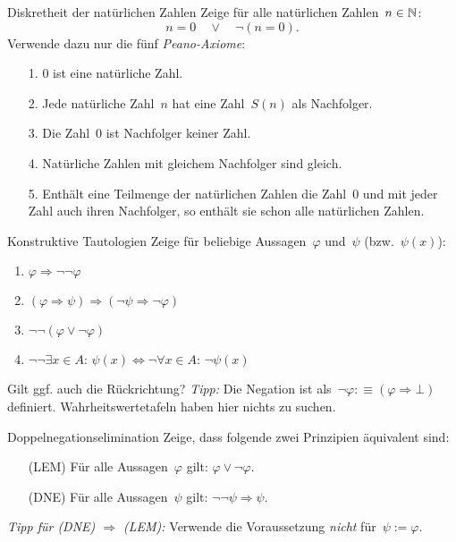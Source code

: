 \documentclass{pizzablatt}
\begin{document}

\begin{aufgabe}{Diskretheit der natürlichen Zahlen}
Zeige für alle natürlichen Zahlen~$n \in \mathbb{N}$:
\[ n = 0 \quad\vee\quad \neg(n = 0). \]
Verwende dazu nur die fünf \emph{Peano-Axiome}:
\begin{enumerate}
\item[1.] $0$ ist eine natürliche Zahl.
\item[2.] Jede natürliche Zahl~$n$ hat eine Zahl~$S(n)$ als Nachfolger.
\item[3.] Die Zahl~$0$ ist Nachfolger keiner Zahl.
\item[4.] Natürliche Zahlen mit gleichem Nachfolger sind gleich.
\item[5.] Enthält eine Teilmenge der natürlichen Zahlen die Zahl~$0$ und mit jeder
Zahl auch ihren Nachfolger, so enthält sie schon alle natürlichen Zahlen.
\end{enumerate}
\end{aufgabe}

\begin{aufgabe}{Konstruktive Tautologien}
Zeige für beliebige Aussagen~$\varphi$ und~$\psi$ (bzw.~$\psi(x)$):
\begin{enumerate}
\item $\varphi \Longrightarrow \neg\neg\varphi$
\item $(\varphi \Rightarrow \psi) \Longrightarrow (\neg\psi \Rightarrow
\neg\varphi)$
\item $\neg\neg(\varphi \vee \neg\varphi)$
\item $\neg\neg\exists x \in A{:}\, \psi(x) \Longleftrightarrow
  \neg\forall x \in A{:}\, \neg\psi(x)$
\end{enumerate}
Gilt ggf. auch die Rückrichtung?
\emph{Tipp:} Die Negation ist als~$\neg\varphi :\equiv (\varphi \Rightarrow
\bot)$ definiert. Wahrheitswertetafeln haben hier nichts zu suchen.
\end{aufgabe}

\begin{aufgabe}{Doppelnegationselimination}
Zeige, dass folgende zwei Prinzipien äquivalent sind:
\begin{enumerate}
\item[] (LEM) Für alle Aussagen~$\varphi$ gilt: $\varphi \vee \neg\varphi$.
\item[] (DNE) Für alle Aussagen~$\psi$ gilt: $\neg\neg\psi \Rightarrow
\psi$.
\end{enumerate}
\emph{Tipp für (DNE) $\Rightarrow$ (LEM):} Verwende die Voraussetzung \emph{nicht} für~$\psi
:= \varphi$.
\end{aufgabe}
\end{document}
